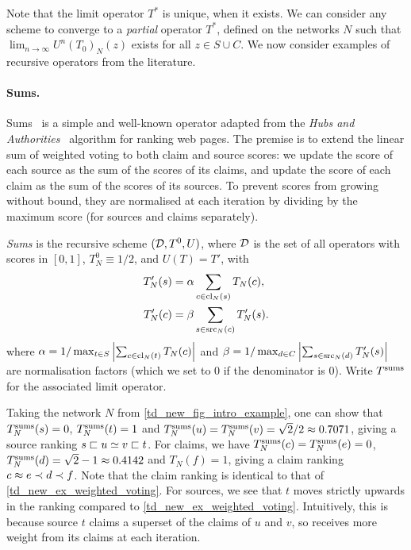 Note that the limit operator $T^*$ is unique, when it exists. We can consider
any scheme to converge to a \emph{partial} operator $T^*$, defined on the
networks $N$ such that $\lim_{n \to \infty}{U^n(T_0)_N(z)}$ exists for all $z
\in S \cup C$. We now consider examples of recursive operators from the
literature.

\paragraph{Sums.}

Sums~\cite{pasternack2010} is a simple and well-known operator adapted from the
\emph{Hubs and Authorities}~\cite{kleinberg1999} algorithm for ranking web
pages. The premise is to extend the linear sum of weighted voting to both claim
and source scores: we update the score of each source as the sum of the scores
of its claims, and update the score of each claim as the sum of the scores of
its sources. To prevent scores from growing without bound, they are normalised
at each iteration by dividing by the maximum score (for sources and claims
separately).

\begin{definition}
    \label{td_new_def_sums}
    \emph{Sums} is the recursive scheme $(\mathcal{D}, T^0, U)$, where $\mathcal{D}$ is the set
    of all operators with scores in $[0, 1]$, $T^0_N \equiv 1 / 2$, and $U(T) =
    T'$, with
    \begin{align*}
        T'_N(s) &=
            \alpha
            \sum_{c \in \operatorname{cl}_N(s)}{
                T_N(c)
            },
        \\
        T'_N(c) &=
            \beta
            \sum_{s \in \operatorname{src}_N(c)}{
                T'_N(s)
            }.
    \end{align*}
    where $
        \alpha = 1 / \max_{t \in S}{
            \left|
                \sum_{c \in \operatorname{cl}_N(t)}{
                    T_N(c)
                }
            \right|
        }
    $ and $
        \beta = 1 / \max_{d \in C}{
            \left|
                \sum_{s \in \operatorname{src}_N(d)}{
                    T'_N(s)
                }
            \right|
        }
    $ are normalisation factors (which we set to 0 if the denominator is 0).
    Write $T^{\operatorname{sums}}$ for the associated limit operator.
\end{definition}

Taking the network $N$ from \cref{td_new_fig_intro_example}, one can show that
$T^{\operatorname{sums}}_N(s) = 0$, $T^{\operatorname{sums}}_N(t) = 1$ and $T^{\operatorname{sums}}_N(u) = T^{\operatorname{sums}}_N(v) = \sqrt{2} / 2
\approx 0.7071$, giving a source ranking $s \sqsubset u \simeq v \sqsubset t$.  For claims,
we have $T^{\operatorname{sums}}_N(c) = T^{\operatorname{sums}}_N(e) = 0$, $T^{\operatorname{sums}}_N(d) = \sqrt{2} - 1 \approx
0.4142$ and $T_N(f) = 1$, giving a claim ranking $c \approx e \prec d \prec f$. Note
that the claim ranking is identical to that of
\cref{td_new_ex_weighted_voting}. For sources, we see that $t$ moves strictly
upwards in the ranking compared to \cref{td_new_ex_weighted_voting}.
Intuitively, this is because source $t$ claims a superset of the claims of $u$
and $v$, so receives more weight from its claims at each iteration.

